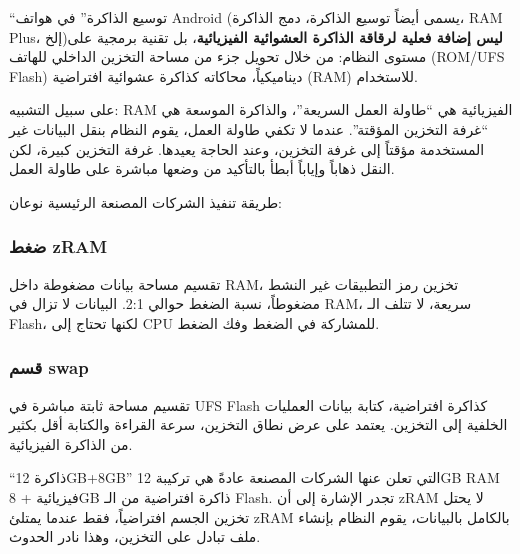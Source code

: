 


“توسيع الذاكرة” في هواتف Android (يسمى أيضاً توسيع الذاكرة، دمج الذاكرة، RAM Plus، إلخ)\textbf{ليس إضافة فعلية لرقاقة الذاكرة العشوائية الفيزيائية}، بل تقنية برمجية على مستوى النظام: من خلال تحويل جزء من مساحة التخزين الداخلي للهاتف (ROM/UFS Flash) ديناميكياً، محاكاته كذاكرة عشوائية افتراضية (RAM) للاستخدام.

على سبيل التشبيه: RAM الفيزيائية هي “طاولة العمل السريعة”، والذاكرة الموسعة هي “غرفة التخزين المؤقتة”. عندما لا تكفي طاولة العمل، يقوم النظام بنقل البيانات غير المستخدمة مؤقتاً إلى غرفة التخزين، وعند الحاجة يعيدها. غرفة التخزين كبيرة، لكن النقل ذهاباً وإياباً أبطأ بالتأكيد من وضعها مباشرة على طاولة العمل.


طريقة تنفيذ الشركات المصنعة الرئيسية نوعان:

\subsubsection*{ضغط zRAM}

تقسيم مساحة بيانات مضغوطة داخل RAM، تخزين رمز التطبيقات غير النشط مضغوطاً، نسبة الضغط حوالي 2:1. البيانات لا تزال في RAM، سريعة، لا تتلف الـ Flash، لكنها تحتاج إلى CPU للمشاركة في الضغط وفك الضغط.

\subsubsection*{قسم swap}

تقسيم مساحة ثابتة مباشرة في UFS Flash كذاكرة افتراضية، كتابة بيانات العمليات الخلفية إلى التخزين. يعتمد على عرض نطاق التخزين، سرعة القراءة والكتابة أقل بكثير من الذاكرة الفيزيائية.

“ذاكرة 12GB+8GB” التي تعلن عنها الشركات المصنعة عادةً هي تركيبة 12GB RAM فيزيائية + 8GB ذاكرة افتراضية من الـ Flash. تجدر الإشارة إلى أن zRAM لا يحتل تخزين الجسم افتراضياً، فقط عندما يمتلئ zRAM بالكامل بالبيانات، يقوم النظام بإنشاء ملف تبادل على التخزين، وهذا نادر الحدوث.



